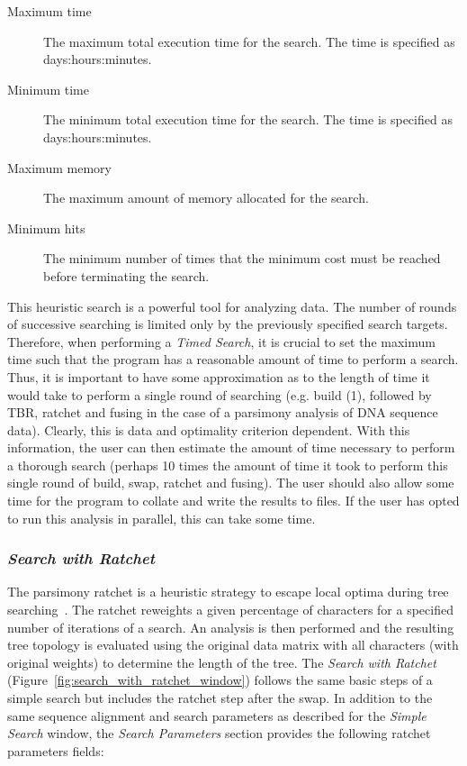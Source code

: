 {\begin{description}
    \item[Maximum time] The maximum total execution time for the search. The time is specified as
        days:hours:minutes.
    \item[Minimum time] The minimum total execution time for the search. The time is specified as
        days:hours:minutes.
    \item[Maximum memory] The maximum amount of memory allocated for the search.
    \item[Minimum hits] The minimum number of times that the minimum cost must be reached before terminating the search.
\end{description}

This heuristic search is a powerful tool for analyzing data. The number of rounds of successive searching is limited 
only by the previously specified search targets. Therefore, when performing a \emph{Timed Search}, it is crucial to 
set the maximum time such that the program has a reasonable amount of time to perform a search.  Thus, it is important 
to have some approximation as to the length of time it would take to perform a single round of searching (e.g. build (1), 
followed by TBR, ratchet and fusing in the case of a parsimony analysis of DNA sequence data).  Clearly, this is data 
and optimality criterion dependent.  With this information, the user can then estimate the amount of time necessary to 
perform a thorough search (perhaps 10 times the amount of time it took to perform this single round of build, swap, ratchet
and fusing).  The user should also allow some time for the program to collate and write the results to 
files.  If the user has opted to run this analysis in parallel, this can take some time.

\subsubsection*{\emph{Search with Ratchet}}

The parsimony ratchet is a heuristic strategy to escape  local optima during tree searching~\cite{Nixon1999}. The 
ratchet reweights a given percentage of characters for a specified number of iterations of a search. An analysis is 
then performed and the resulting tree topology is evaluated using the original data matrix with all characters (with original 
weights) to determine the length of the tree. The \emph{Search with Ratchet} (Figure~\ref{fig:search_with_ratchet_window}) 
follows the same basic steps of a simple search but includes the ratchet step after the swap. In addition to the same sequence 
alignment and search parameters as described for the \emph{Simple Search} window, the \emph{Search Parameters} section 
provides the following ratchet parameters fields:

}
